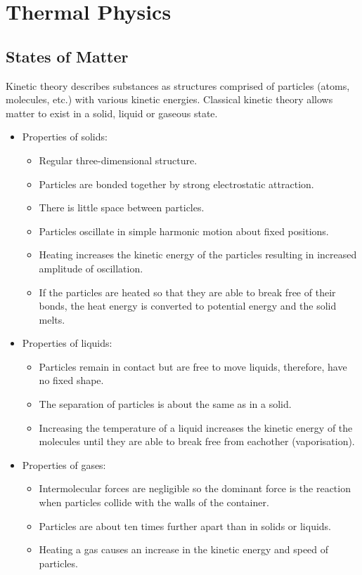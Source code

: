 \documentclass[a4,8pt]{article}
\begin{document}
\section{Thermal Physics}
\subsection{States of Matter}
Kinetic theory describes substances as structures comprised of particles (atoms, molecules, 
etc.) with various kinetic energies. Classical kinetic theory allows matter to exist in a 
solid, liquid or gaseous state.

\begin{itemize}
	\item Properties of solids:
		\begin{itemize}
			\item Regular three-dimensional structure.
			\item Particles are bonded together by strong electrostatic attraction.
			\item There is little space between particles.
			\item Particles oscillate in simple harmonic motion about fixed positions.
			\item Heating increases the kinetic energy of the particles resulting in increased 
            amplitude of oscillation.
			\item If the particles are heated so that they are able to break free of their 
            bonds, the heat energy is converted to potential energy and the solid melts.
		\end{itemize}
	\item Properties of liquids:
		\begin{itemize}
			\item Particles remain in contact but are free to move liquids, therefore, have no 
            fixed shape.
			\item The separation of particles is about the same as in a solid.
			\item Increasing the temperature of a liquid increases the kinetic energy of the 
            molecules until they are able to break free from eachother (vaporisation).
		\end{itemize}
	\item Properties of gases:
		\begin{itemize}
			\item Intermolecular forces are negligible so the dominant force is the reaction 
            when particles collide with the walls of the container.
			\item Particles are about ten times further apart than in solids or liquids.
			\item Heating a gas causes an increase in the kinetic energy and speed of particles.
		\end{itemize}
\end{itemize}
\end{document}
